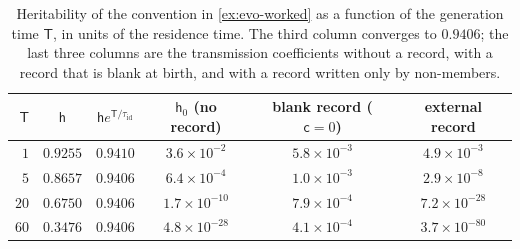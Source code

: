 \begin{table}[t]
\centering\small
\begin{tabular}{@{}rccccc@{}}
\toprule
$\mathsf T$ & $\mathsf h$ & $\mathsf he^{\mathsf T/\tau_{\mathrm{id}}}$ & $\mathsf h_0$ (no record) & blank record ($\mathsf c=0$) & external record\\
\midrule
$1$ & $0.9255$ & $0.9410$ & $3.6\times10^{-2}$ & $5.8\times10^{-3}$ & $4.9\times10^{-3}$\\
$5$ & $0.8657$ & $0.9406$ & $6.4\times10^{-4}$ & $1.0\times10^{-3}$ & $2.9\times10^{-8}$\\
$20$ & $0.6750$ & $0.9406$ & $1.7\times10^{-10}$ & $7.9\times10^{-4}$ & $7.2\times10^{-28}$\\
$60$ & $0.3476$ & $0.9406$ & $4.8\times10^{-28}$ & $4.1\times10^{-4}$ & $3.7\times10^{-80}$\\
\bottomrule
\end{tabular}
\caption{Heritability of the convention in \cref{ex:evo-worked} as a function of the generation time $\mathsf T$, in units of the residence time. The third column converges to $0.9406$; the last three columns are the transmission coefficients without a record, with a record that is blank at birth, and with a record written only by non-members.}
\label{tab:evo-worked}
\end{table}

